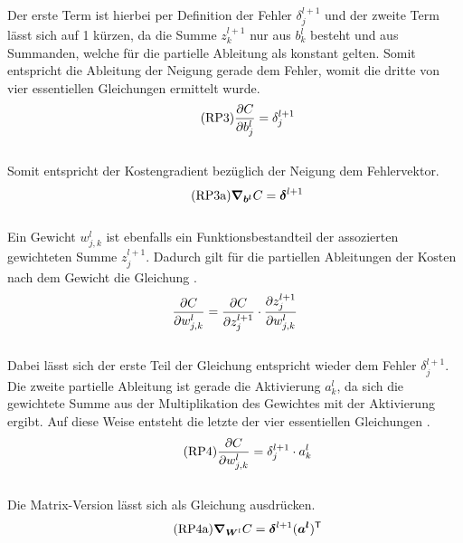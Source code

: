\begin{appendices}
\begin{equation}
\end{equation}
\\
Der erste Term ist hierbei per Definition der Fehler $\delta_j^{l+1}$ und der
zweite Term lässt sich auf 1 kürzen, da die Summe $z_k^{l+1}$ nur aus
$b_k^l$ besteht und aus Summanden, welche für die partielle Ableitung als konstant gelten.
Somit entspricht die Ableitung der Neigung gerade dem Fehler, womit die
dritte  von vier essentiellen Gleichungen ermittelt wurde.
\\
\begin{equation}\tag{RP3}\label{eq:RP3}
  \frac{\partial C}{\partial b_j^l} = \delta_j^{l+1}
\end{equation}
\\
Somit entspricht der Kostengradient bezüglich der Neigung dem Fehlervektor.
\\
\begin{equation}\tag{RP3a}\label{eq:RP3a}
  \bm{\nabla}_{\bm{b^l}} C =  \bm{\delta}^{l+1}
\end{equation}
\\
Ein Gewicht $w_{j,k}^l$ ist ebenfalls ein Funktionsbestandteil der assozierten
gewichteten Summe $z_j^{l+1}$. Dadurch gilt für die partiellen Ableitungen der
Kosten nach dem Gewicht die Gleichung .
\\
\begin{equation}\label{eq:RPh4}
  \frac{\partial C}{\partial w_{j,k}^l} = \frac{\partial C}{\partial z_j^{l+1}} \cdot \frac{\partial z_j^{l+1}}{\partial w_{j,k}^l}
\end{equation}
\\
Dabei lässt sich der erste Teil der Gleichung entspricht wieder dem Fehler $\delta_j^{l+1}$.
Die zweite partielle Ableitung ist gerade die Aktivierung $a_k^l$, da sich die
gewichtete Summe aus der Multiplikation des Gewichtes mit der Aktivierung ergibt.
Auf diese Weise entsteht die letzte der vier essentiellen Gleichungen .
\begin{equation}\tag{RP4}\label{eq:RP4}
  \frac{\partial C}{\partial w_{j,k}^l} = \delta_j^{l+1} \cdot a_k^l
\end{equation}
\\
Die Matrix-Version lässt sich als Gleichung  ausdrücken.
\begin{equation}\tag{RP4a}\label{eq:RP4a}
  \bm{\nabla}_{\bm{W}^l} C = \bm{\delta}^{l+1} (\bm{a^l})^{\mathsf{T}}
\end{equation}


\end{appendices}
